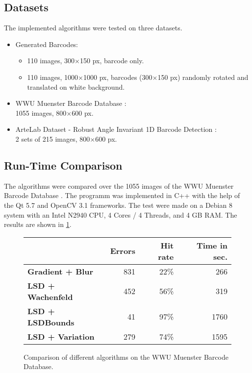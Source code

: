 \subsection{Datasets}
The implemented algorithms were tested on three datasets.
\begin{itemize}
\item Generated Barcodes:
\begin{itemize}
\item 110 images, 300$\times$150 px, barcode only.
\item 110 images, 1000$\times$1000 px, barcodes (300$\times$150 px) randomly rotated and translated on white background.
\end{itemize}
\item WWU Muenster Barcode Database \cite{MuensterBarcodeDB} \citep{wachenfeld2008robust}:\\
1055 images, 800$\times$600 px.
\item ArteLab Dataset - Robust Angle Invariant 1D Barcode Detection \cite{ArteLabDB} \cite{zamberletti2010neural} \citep{zamberletti2013robust}:\\
2 sets of 215 images, 800$\times$600 px.
\end{itemize}

\subsection{Run-Time Comparison}
The algorithms were compared over the 1055 images of the WWU Muenster Barcode Database \citep{MuensterBarcodeDB}. The programm was implemented in C++ with the help of the Qt 5.7 and OpenCV 3.1 frameworks. The test were made on a Debian 8 system with an Intel N2940 CPU, 4 Cores / 4 Threads, and 4 GB RAM. The results are shown in \cref{laufzeit}.

\begin{figure}[t]
\center
\bgroup
\def\arraystretch{1.5}
\begin{tabular}{|l|r|r|r|}
\hline
&\textbf{Errors}&\textbf{Hit rate}&\textbf{Time in sec.}\\
\hline
\textbf{Gradient + Blur}& 831& 22\%& 266\\
\hline
\textbf{LSD + Wachenfeld}& 452& 56\%& 319\\
\hline
\textbf{LSD + LSDBounds}& 41& 97\%& 1760\\
\hline
\textbf{LSD + Variation}& 279& 74\%& 1595\\
\hline
\end{tabular}
\egroup
\caption{Comparison of different algorithms on the WWU Muenster Barcode Database.}
\label{laufzeit}
\end{figure}
 